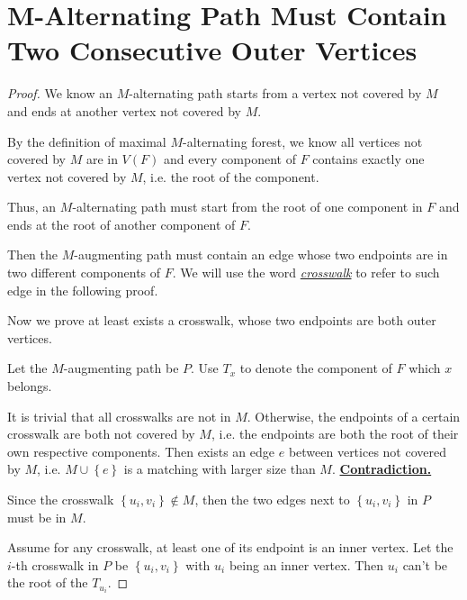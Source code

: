 \documentclass{article}
\newcommand{\set}[1]{\left\{#1\right\}}
\newcommand{\bd}[1]{\boldsymbol{#1}}
\begin{document}
\section{$\bd{M}$-Alternating Path Must Contain Two Consecutive Outer Vertices}
\vspace{1em}
\begin{proof}
    We know an $M$-alternating path starts from a vertex not covered by $M$ and ends at another vertex not covered by $M$. 
    
    \hspace{1.3em}
    By the definition of maximal $M$-alternating forest, we know all vertices not covered by $M$ are in $V(F)$ and every component of $F$ contains exactly one vertex not covered by $M$, i.e. the root of the component. 
    
    \hspace{1.3em}
    Thus, an $M$-alternating path must start from the root of one component in $F$ and ends at the root of another component of $F$.
    
    \hspace{1.3em}
    Then the $M$-augmenting path must contain an edge whose two endpoints are in two different components of $F$. We will use the word \underline{\textit{crosswalk}} to refer to such edge in the following proof.
    
    \hspace{1.3em}
    Now we prove at least exists a crosswalk, whose two endpoints are both outer vertices.
    
    \hspace{1.3em}
    Let the $M$-augmenting path be $P$. Use $T_{x}$ to denote the component of $F$ which $x$ belongs. 

    \hspace{1.3em}
    It is trivial that all crosswalks are not in $M$. Otherwise, the endpoints of a certain crosswalk are both not covered by $M$, i.e. the endpoints are both the root of their own respective components. Then exists an edge $e$ between vertices not covered by $M$, i.e. $M\cup\set{e}$ is a matching with larger size than $M$. \underline{\textbf{Contradiction.}}
    
    \hspace{1.3em}
    Since the crosswalk $\set{u_i,v_i}\notin M$, then the two edges next to $\set{u_i,v_i}$ in $P$ must be in $M$.
    
        
    \hspace{1.3em}
    Assume for any crosswalk, at least one of its endpoint is an inner vertex. Let the $i$-th crosswalk in $P$ be $\set{u_i,v_i}$ with $u_i$ being an inner vertex. Then $u_i$ can't be the root of the $T_{u_i}$.
    

\end{proof}
\end{document}

